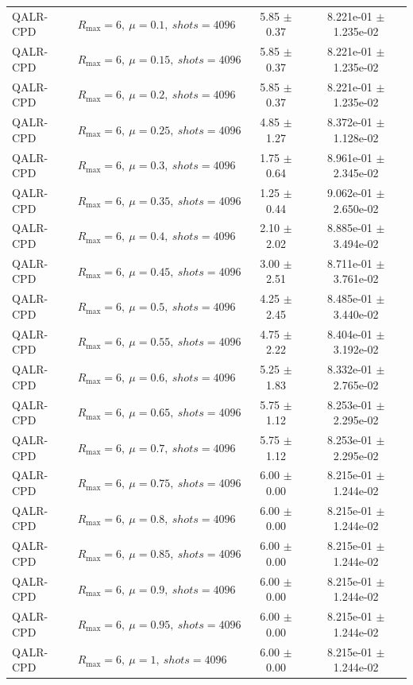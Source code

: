 \begin{table}[t]
\begin{tabular}{@{}llcc@{}}
QALR-CPD & \(R_{\max}=6,\ \mu=0.1,\ shots=4096\) & 5.85 $\pm$ 0.37 & 8.221e-01 $\pm$ 1.235e-02 \\
QALR-CPD & \(R_{\max}=6,\ \mu=0.15,\ shots=4096\) & 5.85 $\pm$ 0.37 & 8.221e-01 $\pm$ 1.235e-02 \\
QALR-CPD & \(R_{\max}=6,\ \mu=0.2,\ shots=4096\) & 5.85 $\pm$ 0.37 & 8.221e-01 $\pm$ 1.235e-02 \\
QALR-CPD & \(R_{\max}=6,\ \mu=0.25,\ shots=4096\) & 4.85 $\pm$ 1.27 & 8.372e-01 $\pm$ 1.128e-02 \\
QALR-CPD & \(R_{\max}=6,\ \mu=0.3,\ shots=4096\) & 1.75 $\pm$ 0.64 & 8.961e-01 $\pm$ 2.345e-02 \\
QALR-CPD & \(R_{\max}=6,\ \mu=0.35,\ shots=4096\) & 1.25 $\pm$ 0.44 & 9.062e-01 $\pm$ 2.650e-02 \\
QALR-CPD & \(R_{\max}=6,\ \mu=0.4,\ shots=4096\) & 2.10 $\pm$ 2.02 & 8.885e-01 $\pm$ 3.494e-02 \\
QALR-CPD & \(R_{\max}=6,\ \mu=0.45,\ shots=4096\) & 3.00 $\pm$ 2.51 & 8.711e-01 $\pm$ 3.761e-02 \\
QALR-CPD & \(R_{\max}=6,\ \mu=0.5,\ shots=4096\) & 4.25 $\pm$ 2.45 & 8.485e-01 $\pm$ 3.440e-02 \\
QALR-CPD & \(R_{\max}=6,\ \mu=0.55,\ shots=4096\) & 4.75 $\pm$ 2.22 & 8.404e-01 $\pm$ 3.192e-02 \\
QALR-CPD & \(R_{\max}=6,\ \mu=0.6,\ shots=4096\) & 5.25 $\pm$ 1.83 & 8.332e-01 $\pm$ 2.765e-02 \\
QALR-CPD & \(R_{\max}=6,\ \mu=0.65,\ shots=4096\) & 5.75 $\pm$ 1.12 & 8.253e-01 $\pm$ 2.295e-02 \\
QALR-CPD & \(R_{\max}=6,\ \mu=0.7,\ shots=4096\) & 5.75 $\pm$ 1.12 & 8.253e-01 $\pm$ 2.295e-02 \\
QALR-CPD & \(R_{\max}=6,\ \mu=0.75,\ shots=4096\) & 6.00 $\pm$ 0.00 & 8.215e-01 $\pm$ 1.244e-02 \\
QALR-CPD & \(R_{\max}=6,\ \mu=0.8,\ shots=4096\) & 6.00 $\pm$ 0.00 & 8.215e-01 $\pm$ 1.244e-02 \\
QALR-CPD & \(R_{\max}=6,\ \mu=0.85,\ shots=4096\) & 6.00 $\pm$ 0.00 & 8.215e-01 $\pm$ 1.244e-02 \\
QALR-CPD & \(R_{\max}=6,\ \mu=0.9,\ shots=4096\) & 6.00 $\pm$ 0.00 & 8.215e-01 $\pm$ 1.244e-02 \\
QALR-CPD & \(R_{\max}=6,\ \mu=0.95,\ shots=4096\) & 6.00 $\pm$ 0.00 & 8.215e-01 $\pm$ 1.244e-02 \\
QALR-CPD & \(R_{\max}=6,\ \mu=1,\ shots=4096\) & 6.00 $\pm$ 0.00 & 8.215e-01 $\pm$ 1.244e-02 \\

\end{tabular}
\end{table}
